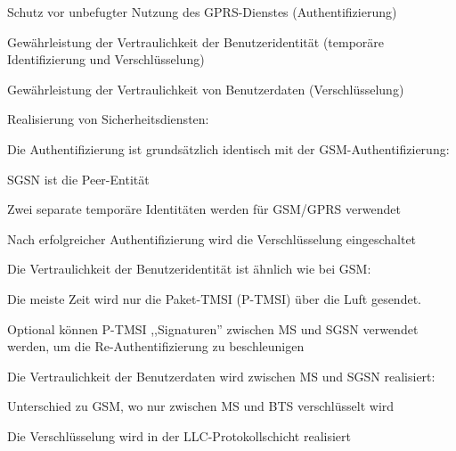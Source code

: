 \documentclass[a4paper]{article}
\begin{document}
\begin{multicols}{3}
\begin{itemize*}
            \begin{itemize*}
                  \item Schutz vor unbefugter Nutzung des GPRS-Dienstes (Authentifizierung)
                  \item Gewährleistung der Vertraulichkeit der Benutzeridentität (temporäre Identifizierung und Verschlüsselung)
                  \item Gewährleistung der Vertraulichkeit von Benutzerdaten (Verschlüsselung)
            \end{itemize*}
            \item
            Realisierung von Sicherheitsdiensten:

            \begin{itemize*}
                  \item Die Authentifizierung ist grundsätzlich identisch mit der GSM-Authentifizierung:
                  \begin{itemize*} \item SGSN ist die Peer-Entität \item Zwei separate temporäre Identitäten werden für GSM/GPRS verwendet \item Nach erfolgreicher Authentifizierung wird die Verschlüsselung eingeschaltet \end{itemize*}
                  \item Die Vertraulichkeit der Benutzeridentität ist ähnlich wie bei GSM:
                  \begin{itemize*} \item Die meiste Zeit wird nur die Paket-TMSI (P-TMSI) über die Luft gesendet. \item Optional können P-TMSI ,,Signaturen'' zwischen MS und SGSN verwendet werden, um die Re-Authentifizierung zu beschleunigen \end{itemize*}
                  \item Die Vertraulichkeit der Benutzerdaten wird zwischen MS und SGSN realisiert:
                  \begin{itemize*} \item Unterschied zu GSM, wo nur zwischen MS und BTS verschlüsselt wird \item Die Verschlüsselung wird in der LLC-Protokollschicht realisiert \end{itemize*}
            \end{itemize*}
      \end{itemize*}



\end{multicols}
\end{document}
